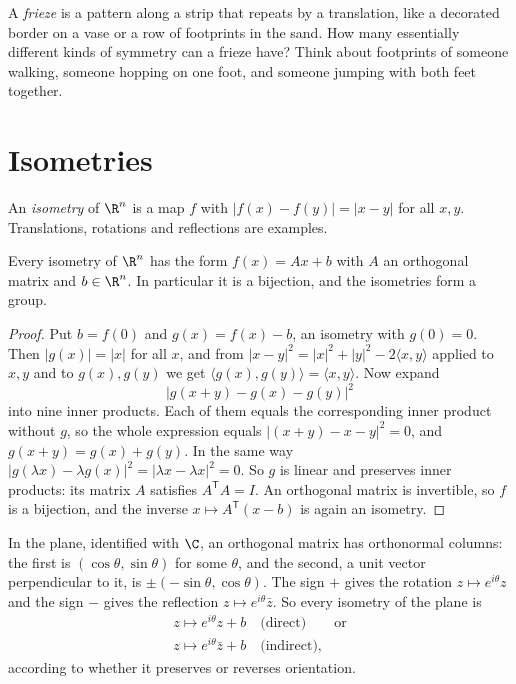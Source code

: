 \begin{think}
A \emph{frieze} is a pattern along a strip that repeats by a translation, like a decorated border on a vase or a row of footprints in
the sand. How many essentially different kinds of symmetry can a frieze have? Think about footprints of someone walking, someone
hopping on one foot, and someone jumping with both feet together.
\end{think}

\section{Isometries}

An \emph{isometry} of $\R^n$ is a map $f$ with $|f(x)-f(y)|=|x-y|$ for all $x,y$. Translations, rotations and reflections are examples.

\begin{theorem}\label{thm:isometryaffine}
Every isometry of $\R^n$ has the form $f(x)=Ax+b$ with $A$ an orthogonal matrix and $b\in\R^n$. In particular it is a bijection, and
the isometries form a group.
\end{theorem}
\begin{proof}
Put $b=f(0)$ and $g(x)=f(x)-b$, an isometry with $g(0)=0$. Then $|g(x)|=|x|$ for all $x$, and from
$|x-y|^2=|x|^2+|y|^2-2\langle x,y\rangle$ applied to $x,y$ and to $g(x),g(y)$ we get $\langle g(x),g(y)\rangle=\langle x,y\rangle$. Now
expand
\[
|g(x+y)-g(x)-g(y)|^2
\]
into nine inner products. Each of them equals the corresponding inner product without $g$, so the whole expression equals
$|(x+y)-x-y|^2=0$, and $g(x+y)=g(x)+g(y)$. In the same way $|g(\lambda x)-\lambda g(x)|^2=|\lambda x-\lambda x|^2=0$. So $g$ is linear and
preserves inner products: its matrix $A$ satisfies $A^{\mathsf T}A=I$. An orthogonal matrix is invertible, so $f$ is a bijection, and
the inverse $x\mapsto A^{\mathsf T}(x-b)$ is again an isometry.
\end{proof}

In the plane, identified with $\C$, an orthogonal matrix has orthonormal columns: the first is $(\cos\theta,\sin\theta)$ for some $\theta$, and
the second, a unit vector perpendicular to it, is $\pm(-\sin\theta,\cos\theta)$. The sign $+$ gives the rotation $z\mapsto e^{i\theta}z$ and the sign $-$
gives the reflection $z\mapsto e^{i\theta}\bar z$. So every isometry of the plane is
\begin{equation}\label{eq:isomC}
\begin{gathered}
z\mapsto e^{i\theta}z+b\quad\text{(direct)}\qquad\text{or}\\
z\mapsto e^{i\theta}\bar z+b\quad\text{(indirect)},
\end{gathered}
\end{equation}
according to whether it preserves or reverses orientation.

